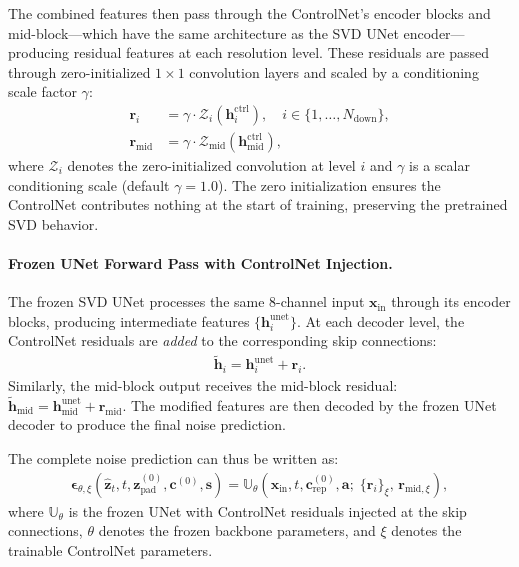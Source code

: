 The combined features then pass through the ControlNet's encoder blocks and mid-block---which have the same architecture as the SVD UNet encoder---producing residual features at each resolution level. These residuals are passed through zero-initialized $1 \times 1$ convolution layers and scaled by a conditioning scale factor $\gamma$:
\begin{align}
    \mathbf{r}_i &= \gamma \cdot \mathcal{Z}_i\!\left(\mathbf{h}_i^{\text{ctrl}}\right), \quad i \in \{1, \ldots, N_{\text{down}}\}, \label{eq:controlnet_residuals} \\
    \mathbf{r}_{\text{mid}} &= \gamma \cdot \mathcal{Z}_{\text{mid}}\!\left(\mathbf{h}_{\text{mid}}^{\text{ctrl}}\right), \label{eq:controlnet_mid_residual}
\end{align}
where $\mathcal{Z}_i$ denotes the zero-initialized convolution at level $i$ and $\gamma$ is a scalar conditioning scale (default $\gamma = 1.0$). The zero initialization ensures the ControlNet contributes nothing at the start of training, preserving the pretrained SVD behavior.

\paragraph{Frozen UNet Forward Pass with ControlNet Injection.}
The frozen SVD UNet processes the same 8-channel input $\mathbf{x}_{\text{in}}$ through its encoder blocks, producing intermediate features $\{\mathbf{h}_i^{\text{unet}}\}$. At each decoder level, the ControlNet residuals are \emph{added} to the corresponding skip connections:
\begin{align}
    \tilde{\mathbf{h}}_i = \mathbf{h}_i^{\text{unet}} + \mathbf{r}_i.
    \label{eq:skip_injection}
\end{align}
Similarly, the mid-block output receives the mid-block residual: $\tilde{\mathbf{h}}_{\text{mid}} = \mathbf{h}_{\text{mid}}^{\text{unet}} + \mathbf{r}_{\text{mid}}$. The modified features are then decoded by the frozen UNet decoder to produce the final noise prediction.

The complete noise prediction can thus be written as:
\begin{align}
    \boldsymbol{\epsilon}_{\theta,\xi}(\hat{\mathbf{z}}_t, t, \mathbf{z}^{(0)}_{\text{pad}}, \mathbf{c}^{(0)}, \mathbf{s}) = \mathbb{U}_\theta\!\left(\mathbf{x}_{\text{in}}, t, \mathbf{c}^{(0)}_{\text{rep}}, \mathbf{a};\; \{\mathbf{r}_i\}_\xi,\, \mathbf{r}_{\text{mid},\xi}\right),
    \label{eq:ctrlv_box2video}
\end{align}
where $\mathbb{U}_\theta$ is the frozen UNet with ControlNet residuals injected at the skip connections, $\theta$ denotes the frozen backbone parameters, and $\xi$ denotes the trainable ControlNet parameters.

